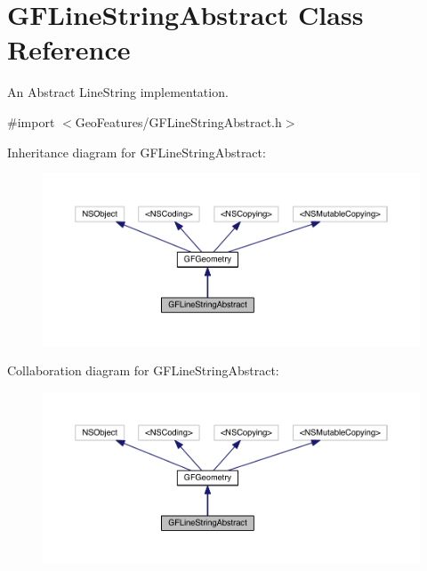 \hypertarget{interface_g_f_line_string_abstract}{}\section{G\+F\+Line\+String\+Abstract Class Reference}
\label{interface_g_f_line_string_abstract}


An Abstract Line\+String implementation.  




{\ttfamily \#import $<$Geo\+Features/\+G\+F\+Line\+String\+Abstract.\+h$>$}



Inheritance diagram for G\+F\+Line\+String\+Abstract\+:
\nopagebreak
\begin{figure}[H]
\begin{center}
\leavevmode
\includegraphics[width=350pt]{interface_g_f_line_string_abstract__inherit__graph}
\end{center}
\end{figure}


Collaboration diagram for G\+F\+Line\+String\+Abstract\+:
\nopagebreak
\begin{figure}[H]
\begin{center}
\leavevmode
\includegraphics[width=350pt]{interface_g_f_line_string_abstract__coll__graph}
\end{center}
\end{figure}
